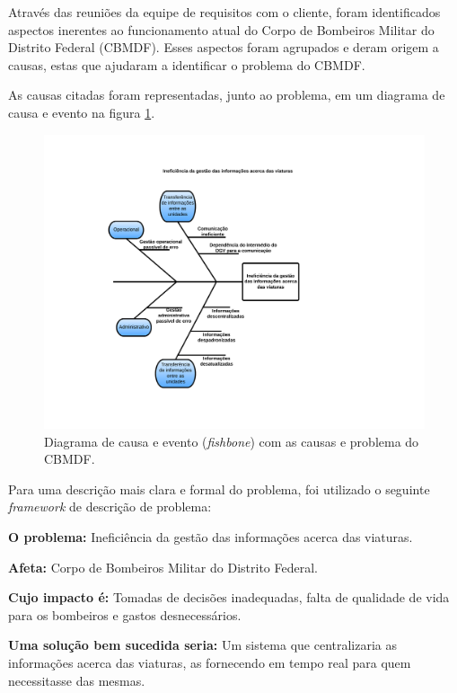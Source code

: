 Através das reuniões da equipe de requisitos com o cliente, foram identificados aspectos inerentes ao funcionamento
atual do Corpo de Bombeiros Militar do Distrito Federal (CBMDF). Esses aspectos foram agrupados e deram origem a causas, estas
que ajudaram a identificar o problema do CBMDF.

As causas citadas foram representadas, junto ao problema, em um diagrama de causa e evento na figura \ref{fishbone}.

  \begin{figure}[!htbp]
    \centering
    \includegraphics[scale=0.8, angle=0]{figuras/fishbone}
    \caption{Diagrama de causa e evento (\textit{fishbone}) com as causas e problema do CBMDF.}
    \label{fishbone}
  \end{figure}

    \vfill
  \pagebreak

Para uma descrição mais clara e formal do problema, foi utilizado o seguinte \textit{framework} de descrição de problema:

  \textbf{O problema:} Ineficiência da gestão das informações acerca das viaturas.
  
  \textbf{Afeta:} Corpo de Bombeiros Militar do Distrito Federal.
  
  \textbf{Cujo impacto é:} Tomadas de decisões inadequadas, falta de qualidade de vida para os bombeiros e 
  gastos desnecessários.
  
  \textbf{Uma solução bem sucedida seria:} Um sistema que centralizaria as informações acerca das viaturas, as fornecendo 
  em tempo real para quem necessitasse das mesmas.
  
  \vfill
  \pagebreak